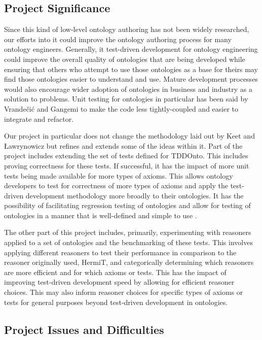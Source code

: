 \documentclass[draft]{sig-alternate}
\begin{document}
\subsection{Project Significance}

Since this kind of low-level ontology authoring has not been widely researched, our efforts into it could improve the ontology authoring process for many ontology engineers. Generally, it test-driven development for ontology engineering could improve the overall quality of ontologies that are being developed while ensuring that others who attempt to use those ontologies as a base for theirs may find those ontologies easier to understand and use. Mature development processes would also encourage wider adoption of ontologies in business and industry as a solution to problems. Unit testing for ontologies in particular has been said by Vrande{\v{c}}i{\'c} and Gangemi \cite{DBLP:conf/otm/VrandecicG06} to make the code less tightly-coupled and easier to integrate and refactor.

Our project in particular does not change the methodology laid out by Keet and {\L}awrynowicz \cite{DBLP:journals/corr/KeetL15} but refines and extends some of the ideas within it. Part of the project includes extending the set of tests defined for TDDOnto. This includes proving correctness for these tests. If successful, it has the impact of more unit tests being made available for more types of axioms. This allows ontology developers to test for correctness of more types of axioms and apply the test-driven development methodology more broadly to their ontologies. It has the possibility of facilitating regression testing of ontologies and allow for testing of ontologies in a manner that is well-defined and simple to use \cite{DBLP:conf/otm/VrandecicG06}.

The other part of this project includes, primarily, experimenting with reasoners applied to a set of ontologies and the benchmarking of these tests. This involves applying different reasoners to test their performance in comparison to the reasoner originally used, HermiT, and categorically determining which reasoners are more efficient and for which axioms or tests. This has the impact of improving test-driven development speed by allowing for efficient reasoner choices. This may also inform reasoner choices for specific types of axioms or tests for general purposes beyond test-driven development in ontologies.

\subsection{Project Issues and Difficulties}
\end{document}
